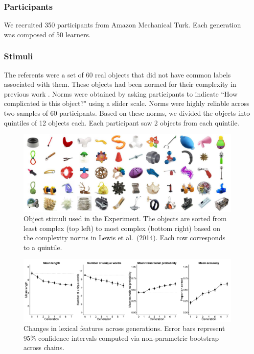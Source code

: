 \subsubsection{Participants} 

We recruited 350 participants from Amazon Mechanical Turk. Each generation was composed of 50 learners.

\subsubsection{Stimuli}

The referents were a set of 60 real objects that did not have common labels associated with them. These objects had been normed for their complexity in previous work \cite[Figure\ 1]{lewisstructure2014}. Norms were obtained by asking participants to indicate ``How complicated is this object?" using a slider scale. Norms were highly reliable across two samples of 60 participants. Based on these norms, we divided the objects into quintiles of 12 objects each. Each participant saw 2 objects from each quintile. 

\begin{figure}[b!]
\begin{center}
\includegraphics[width = 1\linewidth]{figs/realobjs.pdf}
\end{center}
\vspace{-.24em}
\caption{Object stimuli used in the Experiment. The objects are sorted from least complex (top left) to most complex (bottom right) based on the complexity norms in Lewis et al.\ (2014). Each row corresponds to a quintile.}
\label{fig:objs}
\vspace{-1em}
\end{figure}


\begin{figure}[t]
\begin{center}
\includegraphics[scale = .35]{figs/Plot1.pdf}
\end{center}
\vspace{-.5em}
\caption{Changes in lexical features across generations. Error bars represent 95\% confidence intervals computed via non-parametric bootstrap across chains.}
\label{fig:length}
\vspace{-1em}
\end{figure}

